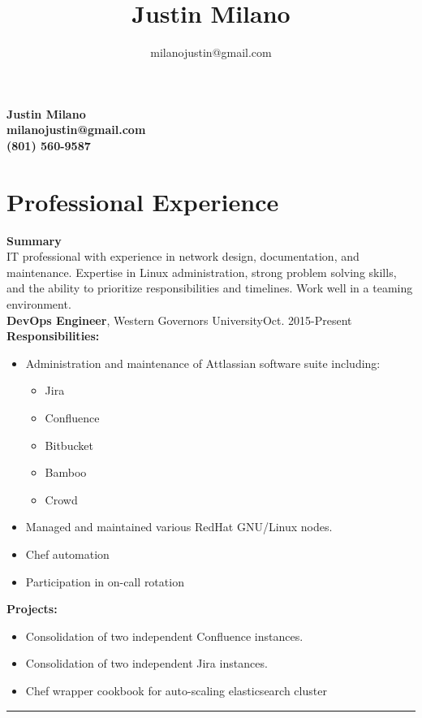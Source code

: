 \documentclass[10pt]{article}
\title{\bfseries\Huge Justin Milano}
\author{milanojustin@gmail.com}
\date{}
\newenvironment{myitemize}
{ \begin{itemize}[topsep=0pt]
  	\vspace{-4pt}
    \setlength{\itemsep}{0pt}
    \setlength{\parskip}{0pt}
    \setlength{\parsep}{0pt}     }
{ \end{itemize}                  }
\newcommand{\breakrule}{
  	\color{lightgray}
  	\vspace{-4pt}
	\begin{center}
		\noindent\rule{7cm}{0.5pt}
	\end{center}
	}
\begin{document}
\begin{center}
	{\bf \Huge Justin Milano}\\
	\vspace{5pt}
	{\bf \large milanojustin@gmail.com}\\
  {\bf \large (801) 560-9587}
\end{center}
\vspace{-5pt}
\section*{Professional Experience}

\noindent
{\large {\bf Summary}} \\
IT professional with experience in network design, documentation, and maintenance. Expertise in Linux administration, strong problem solving skills, and the ability to prioritize responsibilities and timelines. Work well in a teaming environment. \\

\noindent
{\large {\bf DevOps Engineer}, Western Governors University\hfill Oct. 2015-Present } \\
{\bf Responsibilities:}
\begin{myitemize}
  \item Administration and maintenance of Attlassian software suite including:
    \begin{myitemize}
      \item Jira
      \item Confluence
      \item Bitbucket
      \item Bamboo
      \item Crowd
    \end{myitemize}
  \item Managed and maintained various RedHat GNU/Linux nodes.
  \item Chef automation
  \item Participation in on-call rotation
\end{myitemize} 
{\bf Projects:}
\begin{myitemize}
  \item Consolidation of two independent Confluence instances.
  \item Consolidation of two independent Jira instances.
  \item Chef wrapper cookbook for auto-scaling elasticsearch cluster
\end{myitemize} 
{\breakrule}
\end{document}
